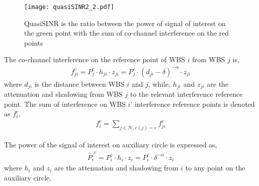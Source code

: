 \begin{figure}[h!]
  \centering
  \texttt{[image: quasiSINR2\_2.pdf]}
  \caption{QuasiSINR is the ratio between the power of signal of interest on the green point with the sum of co-channel interference on the red points}
\label{quasiSINRfigure}
\end{figure}


The co-channel interference on the reference point of WBS $i$ from WBS $j$ is,
\begin{equation}
\label{quasiSINR_inf}
\begin{aligned}
f_{ji}^c = P_{j}^c\cdot h_{ji}\cdot z_{ji} = P_{j}^c\cdot (d_{ji}-\delta)^{-\alpha}\cdot z_{ji}
\end{aligned}
\end{equation}
where $d_{ji}$ is the distance between WBS $i$ and $j$, while, $h_{ji}$ and $z_{ji}$ are the attenuation and shadowing from WBS $j$ to the relevant interference reference point.
The sum of interference on WBS $i$' interference reference points is denoted as $f_{i}^c$.
\begin{equation}
\label{quasiSINR_infs}
\begin{aligned}
f_{i}^c = \sum_{j\in\mathcal{N}, c(j)= c} f_{ji}^c
\end{aligned}
\end{equation}

The power of the signal of interest on auxiliary circle is expressed as,
\begin{equation}
\label{quasiSINR_1}
\begin{aligned}
\tilde{P_i}^c = P_i^c\cdot h_i\cdot z_i = P_i^c\cdot \delta^{-\alpha}\cdot z_i
\end{aligned}
\end{equation}
where $h_i$ and $z_i$ are the attenuation and shadowing from $i$ to any point on the auxiliary circle.





